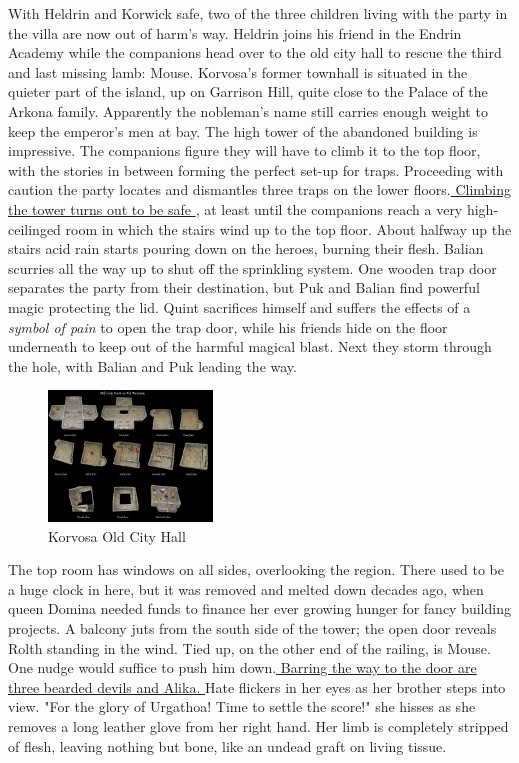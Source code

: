 With Heldrin and Korwick safe, two of the three children living with the party in the villa are now out of harm's way. Heldrin joins his friend in the Endrin Academy while the companions head over to the old city hall to rescue the third and last missing lamb: Mouse. Korvosa's former townhall is situated in the quieter part of the island, up on Garrison Hill, quite close to the Palace of the Arkona family. Apparently the nobleman's name still carries enough weight to keep the emperor's men at bay. The high tower of the abandoned building is impressive. The companions figure they will have to climb it to the top floor, with the stories in between forming the perfect set-up for traps. Proceeding with caution the party locates and dismantles three traps on the lower floors.\hyperref[fig:Korvosa-Old-City-Hall-559764706]{ Climbing the tower turns out to be safe } , at least until the companions reach a very high-ceilinged room in which the stairs wind up to the top floor. About halfway up the stairs acid rain starts pouring down on the heroes, burning their flesh. Balian scurries all the way up to shut off the sprinkling system. One wooden trap door separates the party from their destination, but Puk and Balian find powerful magic protecting the lid. Quint sacrifices himself and suffers the effects of a  {\itshape symbol of pain} to open the trap door, while his friends hide on the floor underneath to keep out of the harmful magical blast. Next they storm through the hole, with Balian and Puk leading the way. \\

\begin{figure}[h]
	\centering
	\includegraphics[width=0.39\textwidth]{images/Korvosa-Old-City-Hall-559764706.jpg}
	\caption{Korvosa Old City Hall}
	\label{fig:Korvosa-Old-City-Hall-559764706}
\end{figure}

The top room has windows on all sides, overlooking the region. There used to be a huge clock in here, but it was removed and melted down decades ago, when queen Domina needed funds to finance her ever growing hunger for fancy building projects. A balcony juts from the south side of the tower; the open door reveals Rolth standing in the wind. Tied up, on the other end of the railing, is Mouse. One nudge would suffice to push him down.\hyperref[fig:Final-showdown-with-Rolth-and-Alika-559765837]{ Barring the way to the door are three bearded devils and Alika. } Hate flickers in her eyes as her brother steps into view. "For the glory of Urgathoa! Time to settle the score!" she hisses as she removes a long leather glove from her right hand. Her limb is completely stripped of flesh, leaving nothing but bone, like an undead graft on living tissue. \\

